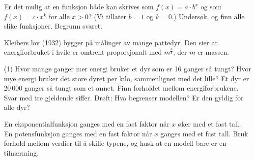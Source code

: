 Er det mulig at en funksjon både kan skrives som $f(x) = a \cdot b^x$ og som $f(x) = c \cdot x^k$ for alle $x > 0$?
(Vi tillater $b = 1$ og $k = 0$.) Undersøk, og finn alle slike funksjoner. Begrunn svaret.

Kleibers lov (1932) bygger på målinger av mange pattedyr. Den sier at energiforbruket i hvile er omtrent proporsjonalt med $m^{\tfrac34}$, der $m$ er massen.
\begin{tasks}(1)
  \task Hvor mange ganger mer energi bruker et dyr som er 16 ganger så tungt?
  \task Hvor mye energi bruker det store dyret per kilo, sammenlignet med det lille?
  \task Et dyr er 20\,000 ganger så tungt som et annet. Finn forholdet mellom energiforbrukene. Svar med tre gjeldende siffer.
  \task Drøft: Hva begrenser modellen? Er den gyldig for alle dyr?
\end{tasks}

\begin{oppsummering}
En eksponentialfunksjon ganges med en fast faktor når $x$ øker med et fast tall.
En potensfunksjon ganges med en fast faktor når $x$ ganges med et fast tall.
Bruk forhold mellom verdier til å skille typene, og husk at en modell bare er en tilnærming.
\end{oppsummering}
